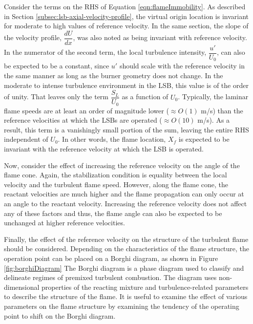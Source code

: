 Consider the terms on the RHS of Equation \ref{eqn:flameImmobility}.
As described in Section \ref{subsec:lsb-axial-velocity-profile}, the virtual origin location is invariant for moderate to high values of reference velocity.
In the same section, the slope of the velocity profile, \(\dfrac{ dU }{ dx }\), was also noted as being invariant with reference velocity.
In the numerator of the second term, the local turbulence intensity, \(\dfrac{ u' }{ U_0 }\), can also be expected to be a constant, since \(u'\) should scale with the reference velocity in the same manner as long as the burner geometry does not change.
In the moderate to intense turbulence environment in the LSB, this value is of the order of unity.\cite{2008-cheng-a}
That leaves only the term \(\dfrac{ S_L }{ U_0 }\) as a function of \(U_0\).
Typically, the laminar flame speeds are at least an order of magnitude lower (\(\approx O(1)\) m/s) than the reference velocities at which the LSBs are operated (\(\approx O(10)\) m/s).
As a result, this term is a vanishingly small portion of the sum, leaving the entire RHS independent of \(U_0\).
In other words, the flame location, \(X_f\) is expected to be invariant with the reference velocity at which the LSB is operated.

Now, consider the effect of increasing the reference velocity on the angle of the flame cone.
Again, the stabilization condition is equality between the local velocity and the turbulent flame speed.
However, along the flame cone, the reactant velocities are much higher and the flame propagation can only occur at an angle to the reactant velocity.
Increasing the reference velocity does not affect any of these factors and thus, the flame angle can also be expected to be unchanged at higher reference velocities.



Finally, the effect of the reference velocity on the structure of the turbulent flame should be considered.
Depending on the characteristics of the flame structure, the operation point can be placed on a Borghi diagram, as shown in Figure \ref{fig:borghiDiagram}
The Borghi diagram is a phase diagram used to classify and delineate regimes of premixed turbulent combustion.
The diagram uses non-dimensional properties of the reacting mixture and turbulence-related parameters to describe the structure of the flame.
It is useful to examine the effect of various parameters on the flame structure by examining the tendency of the operating point to shift on the Borghi diagram.

